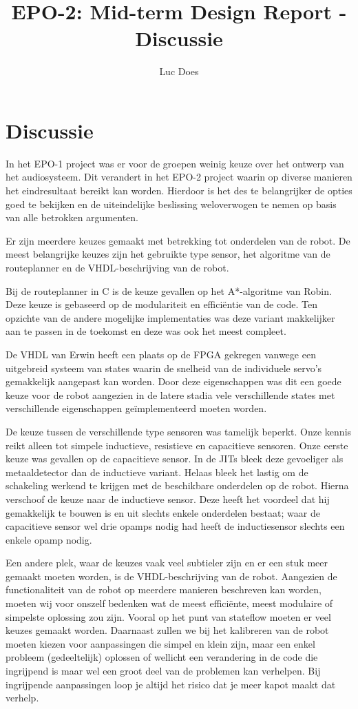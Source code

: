 \documentclass{report}
\title{EPO-2: Mid-term Design Report - Discussie}
\author{Luc Does}
\begin{document}
\chapter{Discussie}
\label{ch:discussie}

In het EPO-1 project was er voor de groepen weinig keuze over het ontwerp van het audiosysteem. Dit verandert in het EPO-2 project waarin op diverse manieren het eindresultaat bereikt kan worden. Hierdoor is het des te belangrijker de opties goed te bekijken en de uiteindelijke beslissing weloverwogen te nemen op basis van alle betrokken argumenten. \newline

Er zijn meerdere keuzes gemaakt met betrekking tot onderdelen van de robot. De meest belangrijke keuzes zijn het gebruikte type sensor, het algoritme van de routeplanner en de VHDL-beschrijving van de robot. \newline

Bij de routeplanner in C is de keuze  gevallen op het A*-algoritme van Robin. Deze keuze is gebaseerd op de modulariteit en efficiëntie van de code. Ten opzichte van de andere mogelijke implementaties was deze variant makkelijker aan te passen in de toekomst en deze was ook het meest compleet. \newline

De VHDL van Erwin heeft een plaats op de FPGA gekregen vanwege een uitgebreid systeem van states waarin de snelheid van de individuele servo's gemakkelijk aangepast kan worden. Door deze eigenschappen was dit een goede keuze voor de robot aangezien in de latere stadia vele verschillende states met verschillende eigenschappen geïmplementeerd moeten worden. \newline

De keuze tussen de verschillende type sensoren was tamelijk beperkt. Onze kennis reikt alleen tot simpele inductieve, resistieve en capacitieve sensoren. Onze eerste keuze was gevallen op de capacitieve sensor. In de JITs bleek deze gevoeliger als metaaldetector dan de inductieve variant. Helaas bleek het lastig om de schakeling werkend te krijgen met de beschikbare onderdelen op de robot. Hierna verschoof de keuze naar de inductieve sensor. Deze heeft het voordeel dat hij gemakkelijk te bouwen is en uit slechts enkele onderdelen bestaat; waar de capacitieve sensor wel drie opamps nodig had heeft de inductiesensor slechts een enkele opamp nodig. \newline

Een andere plek, waar de keuzes vaak veel subtieler zijn en er een stuk meer gemaakt moeten worden, is de VHDL-beschrijving van de robot. Aangezien de functionaliteit van de robot op meerdere manieren beschreven kan worden, moeten wij voor onszelf bedenken wat de meest efficiënte, meest modulaire of simpelste oplossing zou zijn. Vooral op het punt van stateflow moeten er veel keuzes gemaakt worden. Daarnaast zullen we bij het kalibreren van de robot moeten kiezen voor aanpassingen die simpel en klein zijn, maar een enkel probleem (gedeeltelijk) oplossen of wellicht een verandering in de code die ingrijpend is maar wel een groot deel van de problemen kan verhelpen. Bij ingrijpende aanpassingen loop je altijd het risico dat je meer kapot maakt dat verhelp.
\end{document}

